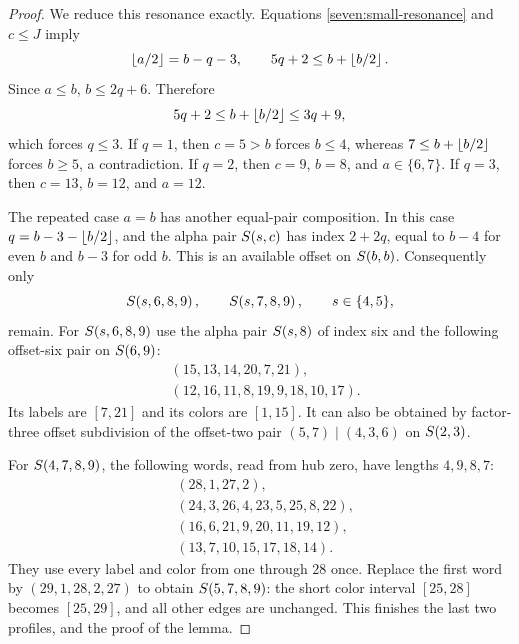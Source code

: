 \begin{proof}
We reduce this resonance exactly.  Equations
\eqref{seven:small-resonance} and $c\le J$ imply
\[
 \left\lfloor a/2\right\rfloor=b-q-3,\qquad
 5q+2\le b+\left\lfloor b/2\right\rfloor.
\]
Since $a\le b$, $b\le2q+6$.  Therefore
\[
 5q+2\le b+\left\lfloor b/2\right\rfloor\le3q+9,
\]
which forces $q\le3$.  If $q=1$, then $c=5>b$ forces $b\le4$,
whereas $7\le b+\left\lfloor b/2\right\rfloor$ forces $b\ge5$, a contradiction.
If $q=2$, then $c=9$, $b=8$, and $a\in\{6,7\}$.
If $q=3$, then $c=13$, $b=12$, and $a=12$.

The repeated case $a=b$ has another equal-pair composition.  In this
case $q=b-3-\left\lfloor b/2\right\rfloor$, and the alpha pair $S\!\left(s,c\right)$ has index
$2+2q$, equal to $b-4$ for even $b$ and $b-3$ for odd $b$.
This is an available offset on $S\!\left(b,b\right)$.  Consequently only
\[
 S\!\left(s,6,8,9\right),\qquad S\!\left(s,7,8,9\right),\qquad s\in\{4,5\},
\]
remain.  For $S\!\left(s,6,8,9\right)$ use the alpha pair $S\!\left(s,8\right)$ of
index six and the following offset-six pair on $S\!\left(6,9\right)$:
\begin{align*}
 &(15,13,14,20,7,21),\\
 &(12,16,11,8,19,9,18,10,17).
\end{align*}
Its labels are $[7,21]$ and its colors are $[1,15]$.  It can also
be obtained by factor-three offset subdivision of the offset-two
pair $(5,7)\mid(4,3,6)$ on $S\!\left(2,3\right)$.

For $S\!\left(4,7,8,9\right)$, the following words, read from hub zero, have
lengths $4,9,8,7$:
\begin{align*}
 &(28,1,27,2),\\
 &(24,3,26,4,23,5,25,8,22),\\
 &(16,6,21,9,20,11,19,12),\\
 &(13,7,10,15,17,18,14).
\end{align*}
They use every label and color from one through $28$ once.
Replace the first word by $(29,1,28,2,27)$ to obtain
$S\!\left(5,7,8,9\right)$: the short color interval $[25,28]$ becomes
$[25,29]$, and all other edges are unchanged.  This finishes the
last two profiles, and the proof of the lemma.
\end{proof}

